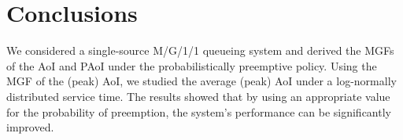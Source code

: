 \documentclass[conference]{IEEEtran}
\def\blue{\textcolor{blue}}
\newcommand{\RY}[1]{{\color{red} RY: #1}}
\begin{document}



\vspace{-3mm}
\section{Conclusions}\label{Conclusions}
We considered a single-source M/G/1/1 queueing system and derived the MGFs of the AoI and PAoI under the probabilistically preemptive policy. Using the MGF of the (peak) AoI, we studied the average (peak) AoI under a log-normally distributed service time. The results showed that by using an appropriate value for the probability of preemption, the system's performance can be significantly improved.



\end{document}
